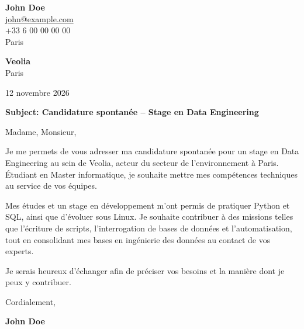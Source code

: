 \documentclass[11pt,a4paper]{article}
\begin{document}
{\Large\bfseries John Doe}\\[0.3cm]


\href{mailto:john@example.com}{john@example.com}\\



+33 6 00 00 00 00\\



Paris\\


\vspace{1cm}

\begin{flushright}

\textbf{Veolia}\\



Paris\\


\vspace{0.5cm}

12 novembre 2026

\end{flushright}

\vspace{0.8cm}

\textbf{Subject: Candidature spontanée – Stage en Data Engineering}

\vspace{0.6cm}


Madame, Monsieur,


\vspace{0.5cm}

\justifying


Je me permets de vous adresser ma candidature spontanée pour un stage en Data Engineering au sein de Veolia, acteur du secteur de l’environnement à Paris. Étudiant en Master informatique, je souhaite mettre mes compétences techniques au service de vos équipes.

\par

Mes études et un stage en développement m’ont permis de pratiquer Python et SQL, ainsi que d’évoluer sous Linux. Je souhaite contribuer à des missions telles que l’écriture de scripts, l’interrogation de bases de données et l’automatisation, tout en consolidant mes bases en ingénierie des données au contact de vos experts.

\par

Je serais heureux d’échanger afin de préciser vos besoins et la manière dont je peux y contribuer.

\par


\vspace{0.7cm}


Cordialement,


\vspace{0.5cm}

\textbf{John Doe}
\end{document}
